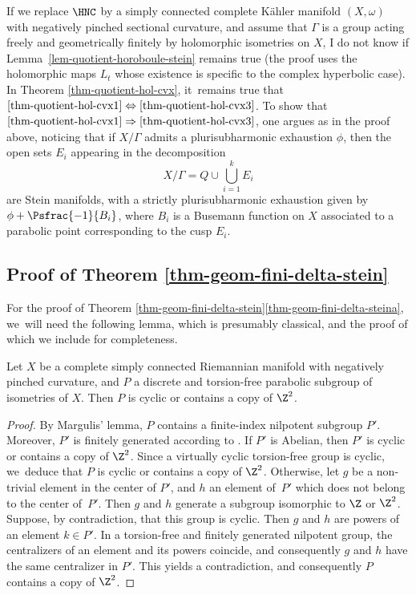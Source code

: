 \begin{remark}
If we replace $\HNC$ by a simply connected complete Kähler manifold $(X,\omega)$ with negatively pinched sectional curvature, and assume that $\Gamma$ is a group acting freely and geometrically finitely by holomorphic isometries on $X$, I do not know if Lemma~\ref{lem-quotient-horoboule-stein} remains true (the proof uses the holomorphic maps $L_t$ whose existence is specific to the complex hyperbolic case). In Theorem \ref{thm-quotient-hol-cvx}, it~remains true that $\eqref{thm-quotient-hol-cvx1}\Leftrightarrow\eqref{thm-quotient-hol-cvx3}$. To show that $\eqref{thm-quotient-hol-cvx1}\Rightarrow\eqref{thm-quotient-hol-cvx3}$, one argues as in the proof above, noticing that if $X/\Gamma$ admits a plurisubharmonic exhaustion $\phi$, then the open sets $E_i$ appearing in the decomposition
\begin{equation*}
X/\Gamma = Q\cup\bigcup_{i=1}^{k}E_i
\end{equation*}
are Stein manifolds, with a strictly plurisubharmonic exhaustion given by $\phi+\Psfrac{-1}{B_i}$, where $B_i$ is a Busemann function on $X$ associated to a parabolic point corresponding to the cusp $E_i$.
\end{remark}

\subsection{Proof of Theorem \ref{thm-geom-fini-delta-stein}}

For the proof of Theorem \ref{thm-geom-fini-delta-stein}\eqref{thm-geom-fini-delta-steina}, we~will need the following lemma, which is presumably classical, and the proof of which we include for completeness.

\begin{lemma}\label{lem_grp_parab_cyclique_ou_Z2}
Let $X$ be a complete simply connected Riemannian manifold with negatively pinched curvature, and $P$ a discrete and torsion-free parabolic subgroup of isometries of $X$. Then $P$ is cyclic or contains a copy of $\Z^{2}$.
\end{lemma}

\begin{proof}
By Margulis' lemma, $P$ contains a finite-index nilpotent subgroup $P'$. Moreover, $P'$ is finitely generated according to \cite{bowditchDiscreteParabolicGroups1993}. If $P'$ is Abelian, then $P'$ is cyclic or contains a copy of $\Z^{2}$. Since a virtually cyclic torsion-free group is cyclic, we~deduce that $P$ is cyclic or contains a copy of $\Z^{2}$. Otherwise, let $g$ be a non-trivial element in the center of $P'$, and $h$ an element of~$P'$ which does not belong to the center of~$P'$. Then $g$ and $h$ generate a subgroup isomorphic to $\Z$ or $\Z^{2}$. Suppose, by contradiction, that this group is cyclic. Then $g$ and $h$ are powers of an element $k\in P'$. In a torsion-free and finitely generated nilpotent group, the centralizers of an element and its powers coincide, and consequently $g$ and $h$ have the same centralizer in $P'$. This yields a contradiction, and consequently $P$ contains a copy of $\Z^{2}$.\qedhere
\end{proof}

